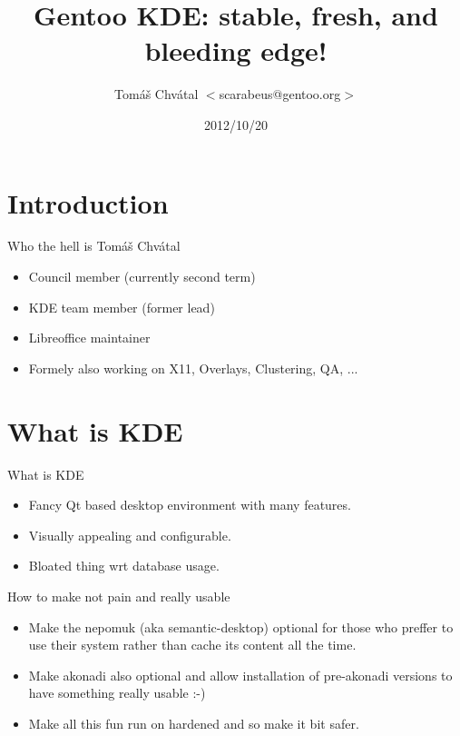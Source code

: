 \documentclass{beamer}
\title{Gentoo KDE: stable, fresh, and bleeding edge!}
\author[Tomáš Chvátal]{Tomáš Chvátal $<$scarabeus@gentoo.org$>$}
\date{2012/10/20}
\begin{document}
\frame{\titlepage}
\section{Introduction}

\begin{frame}{Who the hell is Tomáš Chvátal}
	\begin{itemize}
		\item Council member (currently second term)
		\item KDE team member (former lead)
		\item Libreoffice maintainer
		\item Formely also working on X11, Overlays, Clustering, QA, ...
	\end{itemize}
\end{frame}

\section{What is KDE}

\begin{frame}{What is KDE}
	\begin{itemize}
		\item Fancy Qt based desktop environment with many features.
		\item Visually appealing and configurable.
		\item Bloated thing wrt database usage.
	\end{itemize}
\end{frame}

\begin{frame}{How to make not pain and really usable}
	\begin{itemize}
		\item Make the nepomuk (aka semantic-desktop) optional for those who preffer to use their system rather than cache its content all the time.
		\item Make akonadi also optional and allow installation of pre-akonadi versions to have something really usable :-)
		\item Make all this fun run on hardened and so make it bit safer.
	\end{itemize}
\end{frame}
\end{document}
